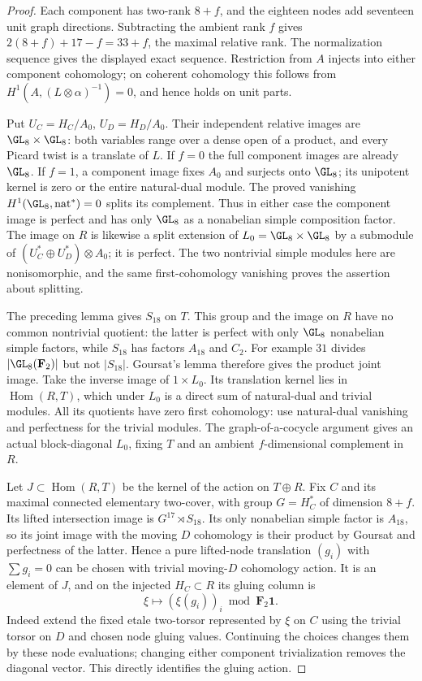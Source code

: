 \begin{proof}
Each component has two-rank $8+f$, and the eighteen nodes add
seventeen unit graph directions. Subtracting the ambient rank
$f$ gives $2(8+f)+17-f=33+f$, the maximal relative rank. The
normalization sequence gives the displayed exact sequence.
Restriction from $A$ injects into either component cohomology;
on coherent cohomology this follows from
$H^1(A,(L\otimes\alpha)^{-1})=0$, and hence holds on unit parts.

Put $U_C=H_C/A_0$, $U_D=H_D/A_0$. Their independent relative
images are $\GL_8\times\GL_8$: both variables range over a dense
open of a product, and every Picard twist is a translate of $L$.
If $f=0$ the full component images are already $\GL_8$.
If $f=1$, a component image fixes $A_0$ and surjects onto $\GL_8$;
its unipotent kernel is zero or the entire natural-dual module.
The proved vanishing $H^1(\GL_8,\mathrm{nat}^*)=0$ splits its
complement. Thus in either case the component image is perfect
and has only $\GL_8$ as a nonabelian simple composition factor.
The image on $R$ is likewise a split extension of
$L_0=\GL_8\times\GL_8$ by a submodule of
$(U_C^*\oplus U_D^*)\otimes A_0$; it is perfect. The two
nontrivial simple modules here are nonisomorphic, and the same
first-cohomology vanishing proves the assertion about splitting.

The preceding lemma gives $S_{18}$ on $T$. This group and the
image on $R$ have no common nontrivial quotient: the latter is
perfect with only $\GL_8$ nonabelian simple factors, while
$S_{18}$ has factors $A_{18}$ and $C_2$. For example $31$ divides
$|\GL_8(\mathbf F_2)|$ but not $|S_{18}|$.
Goursat's lemma therefore gives the product joint image.
Take the inverse image of $1\times L_0$. Its translation kernel
lies in $\operatorname{Hom}(R,T)$, which under $L_0$ is a direct
sum of natural-dual and trivial modules. All its quotients have
zero first cohomology: use natural-dual vanishing and perfectness
for the trivial modules. The graph-of-a-cocycle argument gives
an actual block-diagonal $L_0$, fixing $T$ and an ambient
$f$-dimensional complement in $R$.

Let $J\subset\operatorname{Hom}(R,T)$ be the kernel of the action
on $T\oplus R$. Fix $C$ and its maximal connected elementary
two-cover, with group $G=H_C^*$ of dimension $8+f$. Its lifted
intersection image is $G^{17}\rtimes S_{18}$. Its only nonabelian
simple factor is $A_{18}$, so its joint image with the moving
$D$ cohomology is their product by Goursat and perfectness of
the latter. Hence a pure lifted-node translation $(g_i)$ with
$\sum g_i=0$ can be chosen with trivial moving-$D$ cohomology
action. It is an element of $J$, and on the injected $H_C\subset R$
its gluing column is
\[
                  \xi\longmapsto (\xi(g_i))_i
                                    \bmod\mathbf F_2\mathbf1.
\]
Indeed extend the fixed etale two-torsor represented by $\xi$
on $C$ using the trivial torsor on $D$ and chosen node gluing
values. Continuing the choices changes them by these node
evaluations; changing either component trivialization removes
the diagonal vector. This directly identifies the gluing action.


\end{proof}
